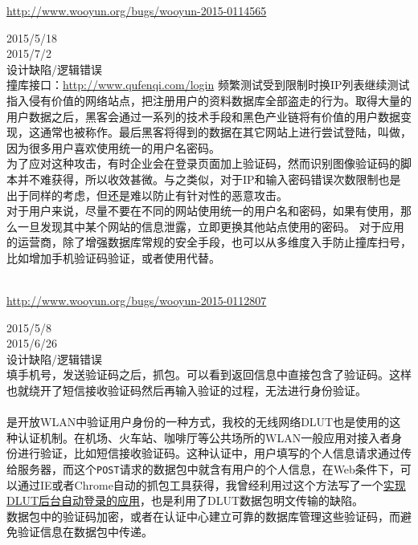 \documentclass{leptc}
\begin{document}
\begin{center}
	\url{http://www.wooyun.org/bugs/wooyun-2015-0114565}
\end{center}
 2015/5/18 \\
 2015/7/2 \\
 设计缺陷/逻辑错误 \\
 撞库接口：\url{http://www.qufenqi.com/login} 频繁测试受到限制时换IP列表继续测试\\
 指入侵有价值的网络站点，把注册用户的资料数据库全部盗走的行为。取得大量的用户数据之后，黑客会通过一系列的技术手段和黑色产业链将有价值的用户数据变现，这通常也被称作。最后黑客将得到的数据在其它网站上进行尝试登陆，叫做，因为很多用户喜欢使用统一的用户名密码。\\
为了应对这种攻击，有时企业会在登录页面加上验证码，然而识别图像验证码的脚本并不难获得，所以收效甚微。与之类似，对于IP和输入密码错误次数限制也是出于同样的考虑，但还是难以防止有针对性的恶意攻击。\\
  对于用户来说，尽量不要在不同的网站使用统一的用户名和密码，如果有使用，那么一旦发现其中某个网站的信息泄露，立即更换其他站点使用的密码。 对于应用的运营商，除了增强数据库常规的安全手段，也可以从多维度入手防止撞库扫号，比如增加手机验证码验证，或者使用代替。\\
\\

\begin{center}
	\url{http://www.wooyun.org/bugs/wooyun-2015-0112807}
\end{center}
 2015/5/8 \\
 2015/6/26 \\
 设计缺陷/逻辑错误 \\
 填手机号，发送验证码之后，抓包。可以看到返回信息中直接包含了验证码。这样也就绕开了短信接收验证码然后再输入验证的过程，无法进行身份验证。\\
\\
 是开放WLAN中验证用户身份的一种方式，我校的无线网络DLUT也是使用的这种认证机制。在机场、火车站、咖啡厅等公共场所的WLAN一般应用对接入者身份进行验证，比如短信接收验证码。这种认证中，用户填写的个人信息请求通过传给服务器，而这个\verb|POST|请求的数据包中就含有用户的个人信息，在Web条件下，可以通过IE或者Chrome自动的抓包工具获得，我曾经利用过这个方法写了一个\href{https://github.com/Lixinyi-DUT/WirelessHelper}{实现DLUT后台自动登录的应用}，也是利用了DLUT数据包明文传输的缺陷。\\
 数据包中的验证码加密，或者在认证中心建立可靠的数据库管理这些验证码，而避免验证信息在数据包中传递。
\end{document}
